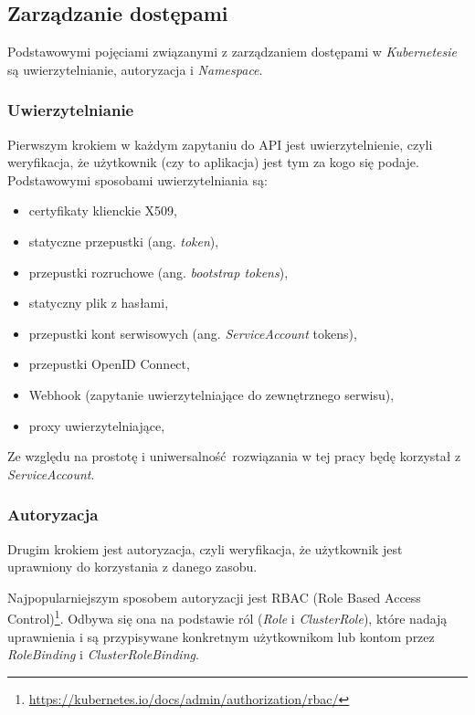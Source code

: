 \documentclass[a4paper,12pt,twoside,openany]{report}
\providecommand{\tightlist}{%
  \setlength{\itemsep}{0pt}\setlength{\parskip}{0pt}}
\DeclareRobustCommand{\href}[2]{#2\footnote{\url{#1}}}
\begin{document}
\hypertarget{zarzux105dzanie-dostux119pami}{%
\subsection{Zarządzanie dostępami}\label{zarzux105dzanie-dostux119pami}}

Podstawowymi pojęciami związanymi z zarządzaniem dostępami w
\emph{Kubernetesie} są uwierzytelnianie, autoryzacja i \emph{Namespace}.

\hypertarget{uwierzytelnianie}{%
\subsubsection{Uwierzytelnianie}\label{uwierzytelnianie}}

Pierwszym krokiem w każdym zapytaniu do API jest uwierzytelnienie, czyli
weryfikacja, że użytkownik (czy to aplikacja) jest tym za kogo się
podaje. Podstawowymi sposobami uwierzytelniania są:

\begin{itemize}
\tightlist
\item
  certyfikaty klienckie X509,
\item
  statyczne przepustki (ang. \emph{token}),
\item
  przepustki rozruchowe (ang. \emph{bootstrap tokens}),
\item
  statyczny plik z hasłami,
\item
  przepustki kont serwisowych (ang. \emph{ServiceAccount} tokens),
\item
  przepustki OpenID Connect,
\item
  Webhook (zapytanie uwierzytelniające do zewnętrznego serwisu),
\item
  proxy uwierzytelniające,
\end{itemize}

Ze względu na prostotę i uniwersalność~rozwiązania w tej pracy będę
korzystał z \emph{ServiceAccount}.

\hypertarget{autoryzacja}{%
\subsubsection{Autoryzacja}\label{autoryzacja}}

Drugim krokiem jest autoryzacja, czyli weryfikacja, że użytkownik jest
uprawniony do korzystania z danego zasobu.

Najpopularniejszym sposobem autoryzacji jest
\href{https://kubernetes.io/docs/admin/authorization/rbac/}{RBAC (Role
Based Access Control)}. Odbywa się ona na podstawie ról (\emph{Role} i
\emph{ClusterRole}), które nadają uprawnienia i są przypisywane
konkretnym użytkownikom lub kontom przez \emph{RoleBinding} i
\emph{ClusterRoleBinding}.
\end{document}
